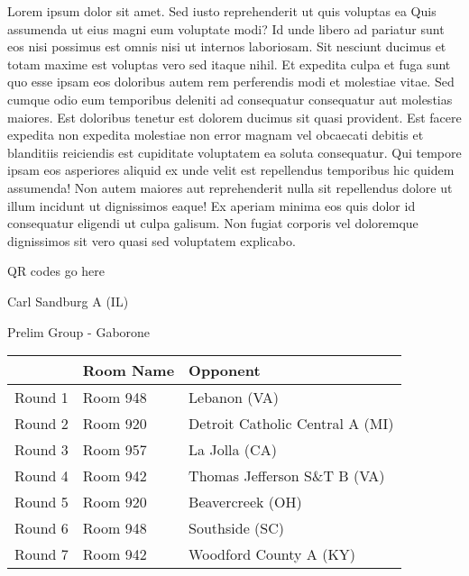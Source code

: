 \documentclass{article}%
\begin{document}
\vspace*{8pt}%
\linebreak%
\newline%
\newline%
Lorem ipsum dolor sit amet. Sed iusto reprehenderit ut quis voluptas ea Quis assumenda ut eius magni eum voluptate modi? Id unde libero ad pariatur sunt eos nisi possimus est omnis nisi ut internos laboriosam. Sit nesciunt ducimus et totam maxime est voluptas vero sed itaque nihil. Et expedita culpa et fuga sunt quo esse ipsam eos doloribus autem rem perferendis modi et molestiae vitae.\newline%
\newline%
Sed cumque odio eum temporibus deleniti ad consequatur consequatur aut molestias maiores. Est doloribus tenetur est dolorem ducimus sit quasi provident. Est facere expedita non expedita molestiae non error magnam vel obcaecati debitis et blanditiis reiciendis est cupiditate voluptatem ea soluta consequatur. Qui tempore ipsam eos asperiores aliquid ex unde velit est repellendus temporibus hic quidem assumenda!\newline%
\newline%
Non autem maiores aut reprehenderit nulla sit repellendus dolore ut illum incidunt ut dignissimos eaque! Ex aperiam minima eos quis dolor id consequatur eligendi ut culpa galisum. Non fugiat corporis vel doloremque dignissimos sit vero quasi sed voluptatem explicabo.\newline%
\newline%
%
\vspace*{30pt}%
\begin{center}%
\begin{Huge}%
QR codes go here%
\end{Huge}%
\end{center}%
\newpage%
%
\begin{center}%
\begin{Huge}%
Carl Sandburg A (IL)%
\end{Huge}%
\vspace*{8pt}%
\linebreak%
\begin{Large}%
Prelim Group {-} Gaborone%
\end{Large}%
\end{center}%
\begin{tabularx}{\textwidth}{|c|Y|Y|}%
\hline%
&Room Name&Opponent\\%
\hline%
Round 1&Room 948&Lebanon (VA)\\%
Round 2&Room 920&Detroit Catholic Central A (MI)\\%
Round 3&Room 957&La Jolla (CA)\\%
Round 4&Room 942&Thomas Jefferson S\&T B (VA)\\%
Round 5&Room 920&Beavercreek (OH)\\%
Round 6&Room 948&Southside (SC)\\%
Round 7&Room 942&Woodford County A (KY)\\%
\hline%
\end{tabularx}%
\end{document}
